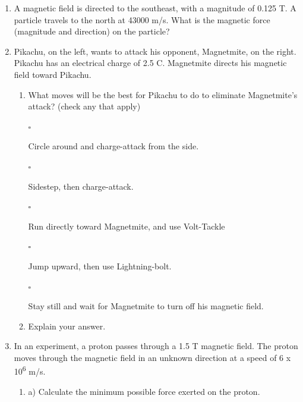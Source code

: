\documentclass[letterpaper, 12pt]{article}
\begin{document}
\begin{enumerate}
	\item  A magnetic field is directed to the southeast, with a magnitude of 0.125 T.  A particle travels to the north at 43000 m/s.  What is the magnetic force (magnitude and direction) on the particle?
	
	\vspace{1in}
	\item Pikachu, on the left, wants to attack his opponent, Magnetmite, on the right.  Pikachu has an electrical charge of 2.5 C. Magnetmite directs his magnetic field toward Pikachu.  
		\begin{enumerate}
			\vspace{-.05in}
			\item What moves will be the best for Pikachu to do to eliminate Magnetmite's attack? (check any that apply)
			
			\begin{large}
				$\square $ 
			\end{large} 
			Circle around and charge-attack from the side.
			
			\begin{large}
				$\square $ 
			\end{large} 
			Sidestep, then charge-attack.
			
			\begin{large}
				$\square $ 
			\end{large} 
			Run directly toward Magnetmite, and use Volt-Tackle
		
			\begin{large}
				$\square $ 
			\end{large} 
			Jump upward, then use Lightning-bolt.
	
			\begin{large}
				$\square $ 
			\end{large} 
			Stay still and wait for Magnetmite to turn off his magnetic field.

			\item Explain your answer.
			\vspace{.9in}
			
			
			
		\end{enumerate}
		
		\item In an experiment, a proton passes through a 1.5 T magnetic field.  The proton moves through the magnetic field in an unknown direction at a speed of 6 x 10\textsuperscript{6} m/s.  
		\begin{enumerate}
			\item a) Calculate the minimum possible force exerted on the proton.
			\vspace{.4in}
			

\end{enumerate}
\end{enumerate}
\end{document}
